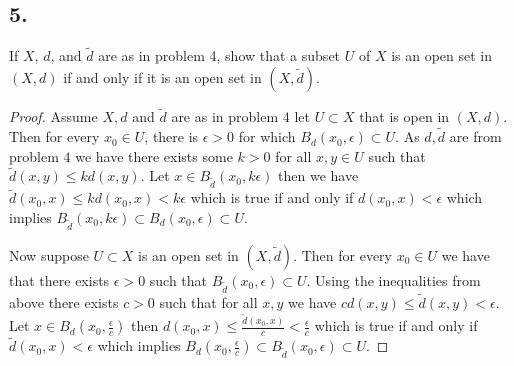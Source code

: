 \documentclass{amsart}
\theoremstyle{plain}
\theoremstyle{definition}
\theoremstyle{remark}
\begin{document}
\vspace{.15in}

\noindent
\subsection*{5.} If $X$, $d$, and $\widetilde{d}$ are as in problem 4, show that a subset $U$ of $X$ is an open set in $(X,d)$ if and only if it is an open set in $(X,\widetilde{d})$.

\begin{proof}
    Assume $X,d$ and $\tilde{d}$ are as in problem $4$ let $U\subset X$ that is open in $(X,d)$. Then for every $x_0\in U$, there is $\epsilon >0$ for which $B_d(x_0,\epsilon)\subset U$. As $d,\tilde{d}$ are from problem $4$ we have there exists some $k>0$ for all $x,y\in U$ such that $\tilde{d}(x,y)\leq kd(x,y)$. Let $x\in B_{\tilde{d}}(x_0,k\epsilon)$ then we have $\tilde{d}(x_0,x)\leq kd(x_0,x)< k\epsilon$ which is true if and only if $d(x_0,x)<\epsilon$ which implies $B_{\tilde{d}}(x_0,k\epsilon)\subset B_d(x_0,\epsilon)\subset U$.

    Now suppose $U\subset X$ is an open set in $(X,\tilde{d})$. Then for every $x_0\in U$ we have that there exists $\epsilon >0$ such that $B_{\tilde{d}}(x_0,\epsilon)\subset U$. Using the inequalities from above there exists $c>0$ such that for all $x,y$ we have $cd(x,y)\leq \tilde{d}(x,y)<\epsilon$. Let $x\in B_{d}(x_0,\frac{\epsilon}{c})$ then $d(x_0,x)\leq \frac{\tilde{d}(x_0,x)}{c}<\frac{\epsilon}{c}$ which is true if and only if $\tilde{d}(x_0,x)<\epsilon$ which implies $B_d(x_0,\frac{\epsilon}{c})\subset B_{\tilde{d}}(x_0,\epsilon)\subset U$.

\end{proof}
\end{document}
